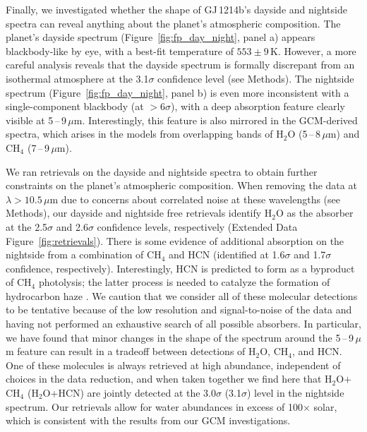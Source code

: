 \documentclass[pdflatex,sn-standardnature]{sn-jnl}%
\begin{document}
Finally, we investigated whether the shape of GJ\,1214b's dayside and nightside spectra can reveal anything about the planet's atmospheric composition.  The planet's dayside spectrum (Figure~\ref{fig:fp_day_night}, panel a) appears blackbody-like by eye, with a best-fit temperature of $553 \pm 9$\,K.  However, a more careful analysis reveals that the dayside spectrum is formally discrepant from an isothermal atmosphere at the 3.1$\sigma$ confidence level (see Methods).  The nightside spectrum (Figure~\ref{fig:fp_day_night}, panel b) is even more inconsistent with a single-component blackbody (at $>6\sigma$), with a deep absorption feature clearly visible at \mbox{5\,--\,9\,$\mu$m}.  Interestingly, this feature is also mirrored in the GCM-derived spectra, which arises in the models from overlapping bands of H$_2$O (5\,--\,8\,$\mu$m) and CH$_4$ \mbox{(7\,--\,9\,$\mu$m)}.



We ran retrievals on the dayside and nightside spectra to obtain further constraints on the planet's atmospheric composition. When removing the data at $\lambda > 10.5$\,$\mu$m due to concerns about correlated noise at these wavelengths (see Methods), our dayside and nightside free retrievals identify H$_2$O as the absorber at the 2.5$\sigma$ and 2.6$\sigma$ confidence levels, respectively (Extended Data Figure~\ref{fig:retrievals}). There is some evidence of additional absorption on the nightside from a combination of CH$_4$ and HCN (identified at 1.6$\sigma$ and 1.7$\sigma$ confidence, respectively). Interestingly, HCN is predicted to form as a byproduct of CH$_4$ photolysis; the latter process is needed to catalyze the formation of hydrocarbon haze \cite{kempton12}. We caution that we consider all of these molecular detections to be tentative because of the low resolution and signal-to-noise of the data and having not performed an exhaustive search of all possible absorbers.  In particular, we have found that minor changes in the shape of the spectrum around the  5\,--\,9\,$\mu$m feature can result in a tradeoff between detections of H$_2$O, CH$_4$, and HCN.  One of these molecules is always retrieved at high abundance, independent of choices in the data reduction, and when taken together we find here that H$_2$O$+$CH$_4$ (H$_2$O+HCN) are jointly detected at the 3.0$\sigma$ (3.1$\sigma$) level in the nightside spectrum.  Our retrievals allow for water abundances in excess of 100$\times$ solar, which is consistent with the results from our GCM investigations.  
\end{document}
